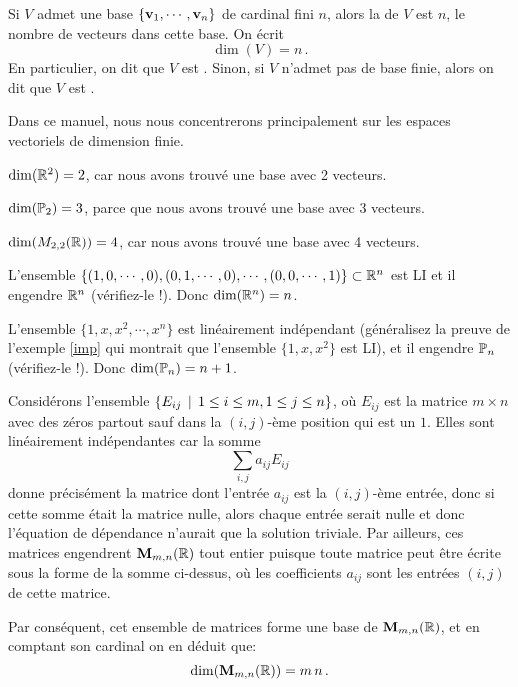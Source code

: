 \begin{definition}  Si $V$ admet une base
$\{\mathbf{v}_1,\cdots, \mathbf{v}_n\}$ de cardinal fini $n$, alors la  de $V$ est
$n$, le nombre de vecteurs dans cette base.  On écrit
$$
\dim(V) = n\,.
$$
En particulier, on dit que $V$ est .  Sinon, si $V$ 
n'admet pas de base finie, alors on dit que $V$ est .
\end{definition}

\begin{remark} Dans ce manuel, nous nous concentrerons principalement sur les espaces vectoriels de dimension finie. 
\end{remark}

\begin{myexample} $\dim(\mathbb{R}^2) = 2$, car nous avons trouvé une base avec 2 vecteurs. \end{myexample}

\begin{myexample} $\dim(\mathbb{P}_2) = 3$, parce que nous avons trouvé une base avec 3 vecteurs. \end{myexample}

\begin{myexample} $\dim(M_{2,2}(\mathbb{R})) = 4$, car nous avons trouvé une base avec 4 vecteurs. \end{myexample}

\begin{myexample} L'ensemble $\{(1,0,\cdots, 0), (0,1,\cdots, 0), \cdots, (0,0, \cdots, 1)\}\subset\mathbb{R}^n$ est LI et il engendre $\mathbb{R}^n$ (vérifiez-le !). Donc $\dim(\mathbb{R}^n) = n$.  \end{myexample}

\begin{myexample} L'ensemble $\{1,x,x^2, \cdots, x^n\}$ est linéairement indépendant (généralisez la preuve de l'exemple \ref{imp} qui montrait que l'ensemble $\{1, x, x^2\}$ est LI), et
il engendre $\mathbb{P}_n$ (vérifiez-le !). Donc $\dim(\mathbb{P}_n) = n+1$.  \end{myexample}

\begin{myexample} Considérons l'ensemble $\{ E_{ij} \, \mid \, 1 \leq i \leq m, 1 \leq j \leq n\}$,
où $E_{ij}$ est la matrice $m \times n$ avec des zéros partout sauf dans
la $(i,j)$-ème position qui est un $1$.  Elles sont linéairement indépendantes car la somme
$$
\sum_{i,j} a_{ij}E_{ij}
$$
donne précisément la matrice dont l'entrée $a_{ij}$ est la $(i,j)$-ème entrée, donc si cette somme était
la matrice nulle, alors chaque entrée serait nulle et donc l'équation de dépendance n'aurait que la solution triviale.  
Par ailleurs, ces matrices engendrent $\mathbf{M}_{m,n}(\mathbb{R})$ tout entier puisque toute matrice peut être écrite sous la forme de la somme ci-dessus, où les coefficients $a_{ij}$ sont les entr\'ees $(i,j)$ de cette matrice. 

Par conséquent, cet ensemble de matrices forme une base de $\mathbf{M}_{m,n}(\mathbb{R})$, et en comptant son cardinal on en déduit que: $$\dim(\mathbf{M}_{m,n}(\mathbb{R})) = m\,n\,.$$  \end{myexample}

